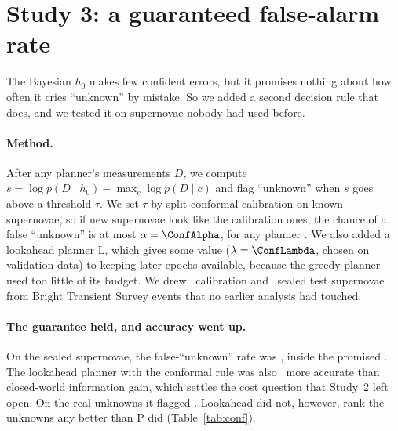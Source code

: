 \section{Study 3: a guaranteed false-alarm rate}\label{sec:conf}
The Bayesian $h_0$ makes few confident errors, but it promises nothing about how often it cries ``unknown'' by mistake. So we added a second decision rule that does, and we tested it on supernovae nobody had used before.

\paragraph{Method.} After any planner's measurements $D$, we compute $s=\log p(D\mid h_0)-\max_c\log p(D\mid c)$ and flag ``unknown'' when $s$ goes above a threshold $\tau$. We set $\tau$ by split-conformal calibration on known supernovae, so if new supernovae look like the calibration ones, the chance of a false ``unknown'' is at most $\alpha=\ConfAlpha$, for any planner \citep{Vovk2005,Angelopoulos2023}. We also added a lookahead planner L, which gives some value ($\lambda=\ConfLambda$, chosen on validation data) to keeping later epochs available, because the greedy planner used too little of its budget. We drew \ConfNCal\ calibration and \ConfNFresh\ sealed test supernovae from Bright Transient Survey events that no earlier analysis had touched.

\begin{table}[t]
\centering\scriptsize
\caption{Conformal open-set study, preregistered results per noise seed: estimate [95\% CI]; $^\times$ marks a criterion not met. Primary system: lookahead planner L with the conformal decision (C-L). $\Delta$: C-L minus closed-world EIG (B3), except HC6 (AUROC of $s$, L minus P). HC1 uses Clopper--Pearson intervals; HC2--HC4 and HC6 use the paired bootstrap.}
\label{tab:conf}

\end{table}

\paragraph{The guarantee held, and accuracy went up.} On the sealed supernovae, the false-``unknown'' rate was \ConfFa, inside the promised \ConfAlphaPct. The lookahead planner with the conformal rule was also \ConfAccGain\ more accurate than closed-world information gain, which settles the cost question that Study~2 left open. On the real unknowns it flagged \ConfFlag. Lookahead did not, however, rank the unknowns any better than P did (Table~\ref{tab:conf}).

